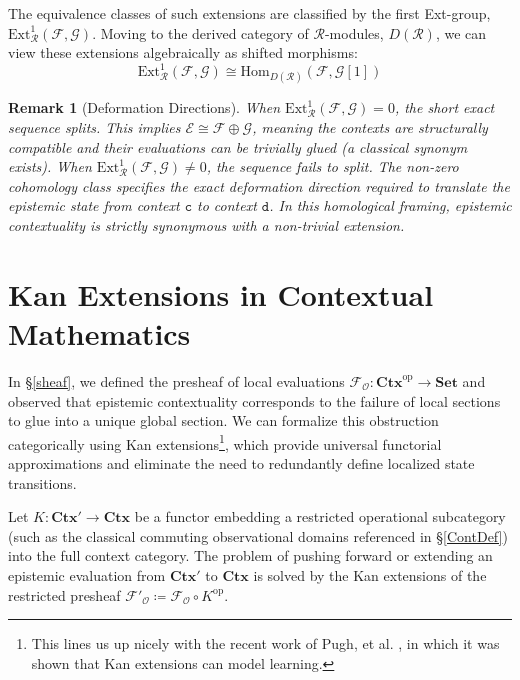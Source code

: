 \documentclass{article}
\newtheorem{rk}{Remark}
\numberwithin{tm}{section}
\numberwithin{dn}{section}
\numberwithin{as}{section}
\numberwithin{rk}{section}
\numberwithin{lem}{section}
\numberwithin{ax}{section}
\numberwithin{pp}{section}
\numberwithin{eg}{section}
\numberwithin{war}{section}
\numberwithin{equation}{section}
\numberwithin{prop}{section}
\numberwithin{nt}{section}
\numberwithin{rc}{section}
\def\code#1{\texttt{#1}}
\begin{document}
The equivalence classes of such extensions are classified by the first Ext-group, $\text{Ext}^1_{\mathcal{R}}(\mathcal{F}, \mathcal{G})$. Moving to the derived category of $\mathcal{R}$-modules, $D(\mathcal{R})$, we can view these extensions algebraically as shifted morphisms:
\begin{equation}
	\text{Ext}^1_{\mathcal{R}}(\mathcal{F}, \mathcal{G}) \cong \text{Hom}_{D(\mathcal{R})}(\mathcal{F}, \mathcal{G}[1])
\end{equation}

\begin{rk}[Deformation Directions]
	When $\text{Ext}^1_{\mathcal{R}}(\mathcal{F}, \mathcal{G}) = 0$, the short exact sequence splits. This implies $\mathcal{E} \cong \mathcal{F} \oplus \mathcal{G}$, meaning the contexts are structurally compatible and their evaluations can be trivially glued (a classical synonym exists). When $\text{Ext}^1_{\mathcal{R}}(\mathcal{F}, \mathcal{G}) \neq 0$, the sequence fails to split. The non-zero cohomology class specifies the exact \emph{deformation direction} required to translate the epistemic state from context $\code{c}$ to context $\code{d}$. In this homological framing, epistemic contextuality is strictly synonymous with a non-trivial extension.
\end{rk}

\section{Kan Extensions in Contextual Mathematics} \label{Kan}

In \S\ref{sheaf}, we defined the presheaf of local evaluations $\mathcal{F}_\mathcal{O}: \mathbf{Ctx}^{\text{op}} \to \mathbf{Set}$ and observed that epistemic contextuality corresponds to the failure of local sections to glue into a unique global section. We can formalize this obstruction categorically using Kan extensions\footnote{This lines us up nicely with the recent work of Pugh, et al. \cite{Pugh}, in which it was shown that Kan extensions can model learning.}, which provide universal functorial approximations and eliminate the need to redundantly define localized state transitions.

Let $K: \mathbf{Ctx}' \to \mathbf{Ctx}$ be a functor embedding a restricted operational subcategory (such as the classical commuting observational domains referenced in \S\ref{ContDef}) into the full context category. The problem of pushing forward or extending an epistemic evaluation from $\mathbf{Ctx}'$ to $\mathbf{Ctx}$ is solved by the Kan extensions of the restricted presheaf $\mathcal{F}'_\mathcal{O} \coloneq \mathcal{F}_\mathcal{O} \circ K^{\text{op}}$.
\end{document}
